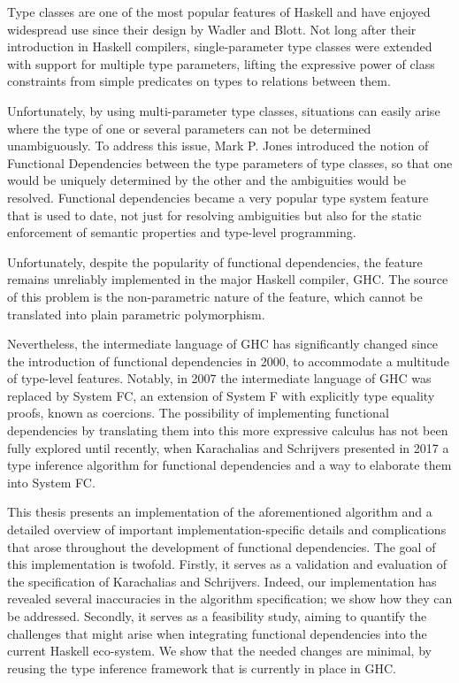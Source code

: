 Type classes are one of the most popular features of Haskell and have enjoyed
widespread use since their design by Wadler and Blott. Not long after their
introduction in Haskell compilers, single-parameter type classes were extended
with support for multiple type parameters, lifting the expressive power of
class constraints from simple predicates on types to relations between them.

Unfortunately, by using multi-parameter type classes, situations can easily
arise where the type of one or several parameters can not be determined
unambiguously. To address this issue, Mark P. Jones introduced the notion of
Functional Dependencies between the type parameters of type classes, so that
one would be uniquely determined by the other and the ambiguities would be
resolved. Functional dependencies became a very popular type system feature
that is used to date, not just for resolving ambiguities but also for the
static enforcement of semantic properties and type-level programming.

Unfortunately, despite the popularity of functional dependencies, the feature
remains unreliably implemented in the major Haskell compiler, GHC. The source
of this problem is the non-parametric nature of the feature, which cannot be
translated into plain parametric polymorphism.

Nevertheless, the intermediate language of GHC has significantly changed since
the introduction of functional dependencies in 2000, to accommodate a multitude
of type-level features. Notably, in 2007 the intermediate language of GHC was
replaced by System FC, an extension of System F with explicitly type equality
proofs, known as coercions. The possibility of implementing functional
dependencies by translating them into this more expressive calculus has not
been fully explored until recently, when Karachalias and Schrijvers presented
in 2017 a type inference algorithm for functional dependencies and a way to
elaborate them into System FC.

This thesis presents an implementation of the aforementioned algorithm and a
detailed overview of important implementation-specific details and
complications that arose throughout the development of functional dependencies.
%
The goal of this implementation is twofold.
%
Firstly, it serves as a validation and evaluation of the specification of
Karachalias and Schrijvers. Indeed, our implementation has revealed several
inaccuracies in the algorithm specification; we show how they can be addressed.
%
Secondly, it serves as a feasibility study, aiming to quantify the challenges
that might arise when integrating functional dependencies into the current
Haskell eco-system. We show that the needed changes are minimal, by reusing the
type inference framework that is currently in place in GHC.

